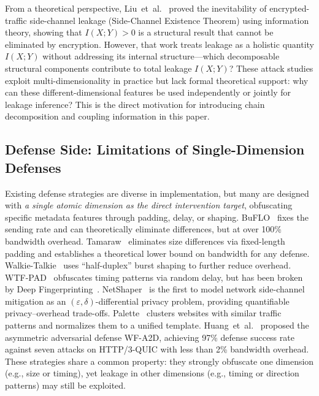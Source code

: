 \documentclass[lettersize,journal]{IEEEtran}
\begin{document}
From a theoretical perspective, Liu~et~al.~\cite{liu2026inevitability}
proved the inevitability of encrypted-traffic side-channel leakage
(Side-Channel Existence Theorem) using information theory, showing that
$I(X;Y)>0$ is a structural result that cannot be eliminated by encryption.
However, that work treats leakage as a holistic quantity $I(X;Y)$ without
addressing its internal structure---which decomposable structural components
contribute to total leakage $I(X;Y)$?
These attack studies exploit multi-dimensionality in practice but lack
formal theoretical support: why can these different-dimensional features be
used independently or jointly for leakage inference?
This is the direct motivation for introducing chain decomposition and
coupling information in this paper.

\subsection{Defense Side: Limitations of Single-Dimension Defenses}

Existing defense strategies are diverse in implementation, but many are
designed with \emph{a single atomic dimension as the direct intervention
target}, obfuscating specific metadata features through padding, delay,
or shaping.
BuFLO~\cite{dyer2012peek} fixes the sending rate and can theoretically
eliminate differences, but at over 100\% bandwidth overhead.
Tamaraw~\cite{cai2014systematic} eliminates size differences via
fixed-length padding and establishes a theoretical lower bound on bandwidth
for any defense.
Walkie-Talkie~\cite{wang2017walkie} uses ``half-duplex'' burst shaping to
further reduce overhead.
WTF-PAD~\cite{juarez2016wtfpad} obfuscates timing patterns via random
delay, but has been broken by Deep Fingerprinting~\cite{sirinam2018deep}.
NetShaper~\cite{sabzi2024netshaper} is the first to model network
side-channel mitigation as an $(\varepsilon,\delta)$-differential privacy
problem, providing quantifiable privacy--overhead trade-offs.
Palette~\cite{shen2024palette} clusters websites with similar traffic
patterns and normalizes them to a unified template.
Huang~et~al.~\cite{huang2025wfa2d} proposed the asymmetric adversarial
defense WF-A2D, achieving 97\% defense success rate against seven attacks
on HTTP/3-QUIC with less than 2\% bandwidth overhead.
These strategies share a common property: they strongly obfuscate one
dimension (e.g., size or timing), yet leakage in other dimensions (e.g.,
timing or direction patterns) may still be exploited.
\end{document}
